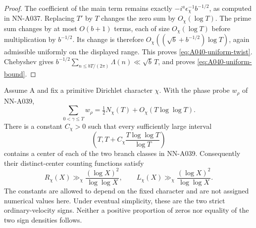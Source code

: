 \begin{proof}
The coefficient of the main term remains exactly
$-i^a\epsilon_\chi^{-1}b^{-1/2}$, as computed in NN-A037.
Replacing $T'$ by $T$ changes the zero sum by $O_\chi(\log T)$.
The prime sum changes by at most $O(b+1)$ terms, each of size
$O_\chi(\log T)$ before multiplication by $b^{-1/2}$.
Its change is therefore
$O_\chi((\sqrt b+b^{-1/2})\log T)$, again admissible uniformly
on the displayed range. This proves
\eqref{eq:A040-uniform-twist}. Chebyshev gives
$b^{-1/2}\sum_{n\le bT/(2\pi)}\Lambda(n)\ll\sqrt b\,T$,
and proves \eqref{eq:A040-uniform-bound}.
\end{proof}

\begin{theorem}
\label{thm:A040-quantitative-signs}
Assume A and fix a primitive Dirichlet character $\chi$.
With the phase probe $w_\rho$ of NN-A039,
\begin{equation}\label{eq:A040-probe-error}
             \sum_{0<\gamma\le T}w_\rho
                =\tfrac12N_\chi(T)+O_\chi(T\log\log T).
\end{equation}
There is a constant $C_\chi>0$ such that every sufficiently
large interval
\begin{equation}\label{eq:A040-short-window}
       \left(T,T+C_\chi\frac{T\log\log T}{\log T}\right)
\end{equation}
contains a center of each of the two branch classes in NN-A039.
Consequently their distinct-center counting functions satisfy
\begin{equation}\label{eq:A040-counts}
 R_\chi(X)\gg_\chi\frac{(\log X)^2}{\log\log X},\qquad
 L_\chi(X)\gg_\chi\frac{(\log X)^2}{\log\log X}.
\end{equation}
The constants are allowed to depend on the fixed character and
are not assigned numerical values here. Under eventual simplicity,
these are the two strict ordinary-velocity signs. Neither a positive
proportion of zeros nor equality of the two sign densities follows.
\end{theorem}

